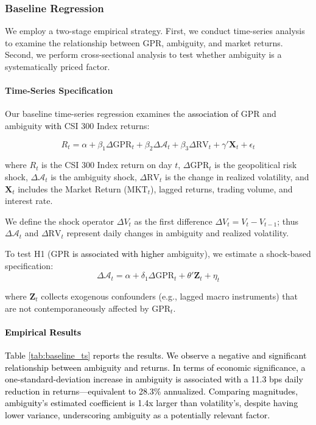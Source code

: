 \documentclass[preprint,12pt,authoryear]{elsarticle}
\begin{document}
\subsubsection{Baseline Regression}

We employ a two-stage empirical strategy. First, we conduct time-series analysis to examine the relationship between GPR, ambiguity, and market returns. Second, we perform cross-sectional analysis to test whether ambiguity is a systematically priced factor.

\paragraph{Time-Series Specification}
Our baseline time-series regression examines the \textcolor{black}{association of} GPR and ambiguity \textcolor{black}{with} CSI 300 Index returns:

\begin{equation}
R_{t} = \alpha + \beta_1 \Delta \text{GPR}_{t} + \beta_2 \Delta \mathcal{A}_{t} + \beta_3 \Delta \text{RV}_{t} + \gamma' \mathbf{X}_{t} + \epsilon_{t}
\end{equation}

where $R_t$ is the CSI 300 Index return on day $t$, $\Delta \text{GPR}_t$ is the geopolitical risk shock, $\Delta \mathcal{A}_t$ is the ambiguity shock, $\Delta \text{RV}_t$ is the change in realized volatility, and $\mathbf{X}_t$ includes the Market Return ($\text{MKT}_t$), lagged returns, trading volume, and interest rate.

We define the shock operator $\Delta V_t$ as the first difference $\Delta V_t = V_t - V_{t-1}$; thus $\Delta \mathcal{A}_t$ and $\Delta \text{RV}_t$ represent daily changes in ambiguity and realized volatility.

To test H1 (GPR \textcolor{black}{is associated with higher} ambiguity), we estimate a shock-based specification:
\begin{equation}
\Delta \mathcal{A}_{t} = \alpha + \delta_1 \Delta \text{GPR}_{t} + \theta' \mathbf{Z}_{t} + \eta_{t}
\end{equation}

where $\mathbf{Z}_t$ collects exogenous confounders (e.g., lagged macro instruments) that are not contemporaneously affected by $\text{GPR}_t$.

\paragraph{\textcolor{black}{Empirical Results}}
\textcolor{black}{Table \ref{tab:baseline_ts} reports the results. We observe a negative and significant relationship between ambiguity and returns. In terms of economic significance, a one-standard-deviation increase in ambiguity is associated with a 11.3 bps daily reduction in returns---equivalent to 28.3\% annualized. Comparing magnitudes, ambiguity's \textcolor{black}{estimated coefficient} is 1.4x larger than volatility's, despite having lower variance, underscoring \textcolor{black}{ambiguity as a potentially relevant factor}.}
\end{document}
